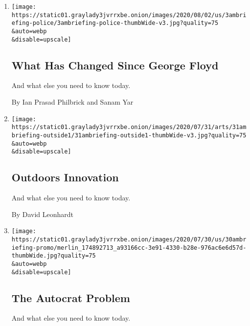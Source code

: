 \begin{enumerate}
\def\labelenumi{\arabic{enumi}.}
\item
  \href{/2020/08/03/briefing/coronavirus-vaccine-tropical-storm-isaias-tiktok-your-monday-briefing.html}{}

  \texttt{[image: https://static01.graylady3jvrrxbe.onion/images/2020/08/02/us/3ambriefing-police/3ambriefing-police-thumbWide-v3.jpg?quality=75\\\&auto=webp\\\&disable=upscale]}

  \hypertarget{what-has-changed-since-george-floyd}{%
  \subsection{What Has Changed Since George
  Floyd}\label{what-has-changed-since-george-floyd}}

  And what else you need to know today.

  By Ian Prasad Philbrick and Sanam Yar
\item
  \href{/2020/07/31/briefing/nba-economy-herman-cain-your-friday-briefing.html}{}

  \texttt{[image: https://static01.graylady3jvrrxbe.onion/images/2020/07/31/arts/31ambriefing-outside1/31ambriefing-outside1-thumbWide-v3.jpg?quality=75\\\&auto=webp\\\&disable=upscale]}

  \hypertarget{outdoors-innovation}{%
  \subsection{Outdoors Innovation}\label{outdoors-innovation}}

  And what else you need to know today.

  By David Leonhardt
\item
  \href{/2020/07/30/briefing/mark-zuckerberg-louie-gohmert-ruth-bader-ginsburg-your-thursday-briefing.html}{}

  \texttt{[image: https://static01.graylady3jvrrxbe.onion/images/2020/07/30/us/30ambriefing-promo/merlin\_174892713\_a93166cc-3e91-4330-b28e-976ac6e6d57d-thumbWide.jpg?quality=75\\\&auto=webp\\\&disable=upscale]}

  \hypertarget{the-autocrat-problem}{%
  \subsection{The Autocrat Problem}\label{the-autocrat-problem}}

  And what else you need to know today.


\end{enumerate}
